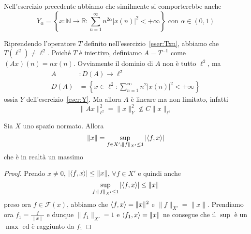 Nell'esercizio precedente abbiamo che similmente si comporterebbe anche
\[
  Y_{\alpha}  = \left\{x: \mathbb{N}\to \mathbb{R} : \sum_{n=1}^{\infty} n^{2 \alpha} |x{(n)}|^2 < +\infty  \right\} \text{ con } \alpha \in (0, 1)
\]

Riprendendo l'operatore \(T\) definito nell'esercizio~\ref{eser:Txn}, abbiamo
che \(T{(\ell^2)} \neq \ell^2\). Poiché \(T\) è iniettivo, definiamo \(A = T^{-1}\) come \({(Ax)}{(n)} = nx{(n)}\). Ovviamente il dominio di \(A\) non è tutto \(\ell^2\), ma
\begin{align*}
    A&: D{(A)} \longrightarrow \ell^2 \\
    D{(A)} &= \left\{ x \in \ell^2 : \sum_{n=1}^{\infty} n^2 | x{(n)}|^2 < +\infty  \right\} 
\end{align*}
ossia \(Y\) dell'esercizio~\ref{eser:Y}. Ma allora \(A\) è lineare ma non
limitato, infatti
\[
  \|Ax\|^2_{\ell^2} = \|x\|^2_Y \not \le  C \|x\|_{\ell^2} 
\]
\begin{corollary}{}
    Sia \(X\) uno spazio normato. Allora
    \[
      \|x\| = \sup_{f \in X' ; \|f\|_{X'} \le 1 } |{\left\langle f, x\right\rangle}|
    \]
    che è in realtà un massimo
\end{corollary}
\begin{proof}{}
    Prendo \(x\neq 0\), \(|{\left\langle f, x\right\rangle} | \le  \|x\|\), \(\forall f \in X'\) e
    quindi anche
    \[
      \sup_{f : \|f\|_{X'} \le 1 } |{\left\langle f, x\right\rangle} | \le  \|x\|
    \]
    preso ora \(
    f \in \mathcal{F}{(x)}\), abbiamo che \({\left\langle f, x\right\rangle} = \|x\|^2\) e \(\|f\|_{X'} = \|x\|\). Prendiamo ora \(f_{1} = \frac{f}{\|x\|}\) e dunque \(\|f_{1}\|_{X'} = 1\) e \({\left\langle f_{1}, x\right\rangle} = \|x\| \) 
    ne consegue che il \(\sup\) è un \(\max\) ed è raggiunto da \(f_{1}\) 
\end{proof}

